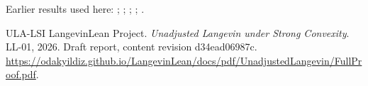 \documentclass[11pt,a4paper]{article}
\begin{document}
Earlier results used here: \cite[Section~3.20.1]{LangevinLean2026ULASC}; \cite[Section~3.20.4]{LangevinLean2026ULASC}; \cite[Section~3.20.5]{LangevinLean2026ULASC}; \cite[Section~3.26.3]{LangevinLean2026ULASC}; \cite[Section~3.36.14]{LangevinLean2026ULASC}.

\begin{thebibliography}{ULA-LSI}
LangevinLean Project. \emph{Unadjusted Langevin under Strong Convexity}. LL-01, 2026. Draft report, content revision d34ead06987c. \url{https://odakyildiz.github.io/LangevinLean/docs/pdf/UnadjustedLangevin/FullProof.pdf}.
\end{thebibliography}
\end{document}
